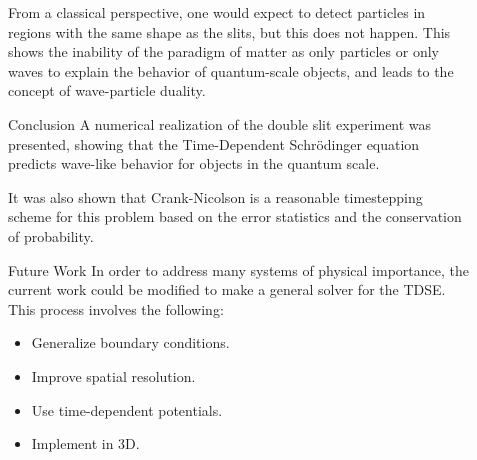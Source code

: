 \documentclass[final]{beamer}
\newlength{\sepwid}
\newlength{\onecolwid}
\newlength{\twocolwid}
\begin{document}
\begin{frame}[t]
\begin{columns}[t]
\begin{column}{\twocolwid}
\begin{columns}[t,totalwidth=\twocolwid]




\end{columns} %

\end{column} %

\begin{column}{\sepwid}\end{column} %

\begin{column}{\onecolwid} %

\begin{block}{}
	From a classical perspective, one would expect to detect particles in regions with the same shape as the slits, but this does not happen. This shows the inability of the paradigm of matter as only particles or only waves to explain the behavior of quantum-scale objects, and leads to the concept of wave-particle duality.
	
\end{block}
\begin{block}{Conclusion}
A numerical realization of the double slit experiment was presented, showing that the Time-Dependent Schr\"{o}dinger equation predicts wave-like behavior for objects in the quantum scale.\par
It was also shown that Crank-Nicolson is a reasonable timestepping scheme for this problem based on the error statistics and the conservation of probability.

\end{block}


\begin{block}{Future Work}
In order to address many systems of physical importance, the current work could be modified to make a general solver for the TDSE. This process involves the following:
\begin{itemize}
\item Generalize boundary conditions.
\item Improve spatial resolution.
\item Use time-dependent potentials.
\item Implement in 3D.
\end{itemize}


\end{block}
\end{column}
\end{columns}
\end{frame}
\end{document}
